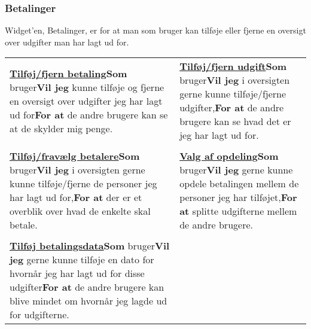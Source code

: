 \newpage
\subsubsection{Betalinger}
Widget'en, Betalinger, er for at man som bruger kan tilføje eller fjerne en oversigt over udgifter man har lagt ud for.\newline

\begin{tabular}{p{2.5in}p{2.5in}}
\textbf{\underline{Tilføj/fjern betaling}}\newline \textbf{Som} bruger\newline \textbf{Vil jeg} kunne tilføje og fjerne en oversigt over udgifter jeg har lagt ud for\newline \textbf{For at} de andre brugere kan se at de skylder mig penge. & 

\textbf{\underline{Tilføj/fjern udgift}}\newline \textbf{Som} bruger\newline \textbf{Vil jeg} i oversigten gerne kunne tilføje/fjerne udgifter,\newline \textbf{For at} de andre brugere kan se hvad det er jeg har lagt ud for.  \\\\

\textbf{\underline{Tilføj/fravælg betalere}}\newline \textbf{Som} bruger\newline \textbf{Vil jeg} i oversigten gerne kunne tilføje/fjerne de personer jeg har lagt ud for,\newline \textbf{For at} der er et overblik over hvad de enkelte skal betale.  & 

\textbf{\underline{Valg af opdeling}}\newline \textbf{Som} bruger\newline \textbf{Vil jeg} gerne kunne opdele betalingen mellem de personer jeg har tilføjet,\newline \textbf{For at} splitte udgifterne mellem de andre brugere.  \\\\  

\textbf{\underline{Tilføj betalingsdata}}\newline \textbf{Som} bruger\newline \textbf{Vil jeg} gerne kunne tilføje en dato for hvornår jeg har lagt ud for disse udgifter\newline \textbf{For at} de andre brugere kan blive mindet om hvornår jeg lagde ud for udgifterne.  &


\end{tabular}
